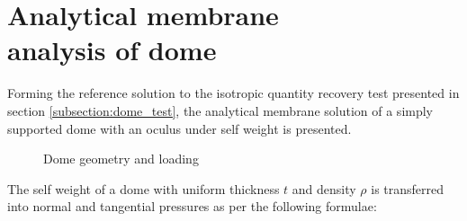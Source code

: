 
\chapter[Analytical membrane analysis of dome]{Analytical membrane\\ analysis of dome}
\label{app:Analytical membrane analysis of dome}
\renewcommand{\Thema}{Analytical membrane analysis of dome}

Forming the reference solution to the isotropic quantity recovery test presented in section \ref{subsection:dome_test}, the analytical membrane solution of a simply supported dome with an oculus under self weight is presented.

\begin{figure}[H]
	\caption{\label{App3_dome}Dome geometry and loading}
\end{figure}

The self weight of a dome with uniform thickness $t$ and density $\rho$ is transferred into normal and tangential pressures as per the following formulae:

